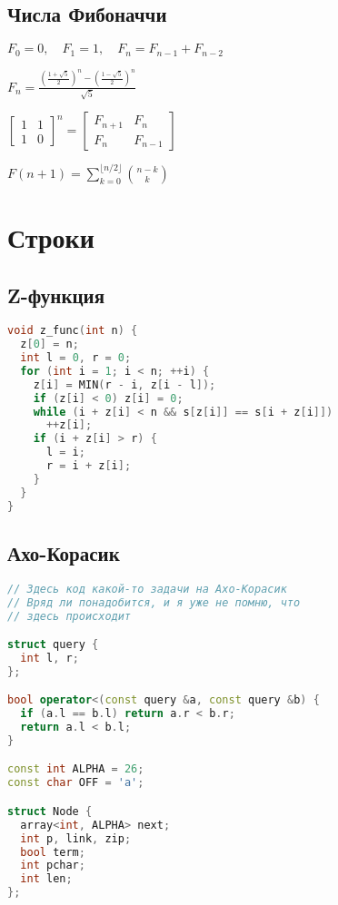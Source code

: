 \documentclass[10pt,a4paper,landscape,twosided]{extarticle}
\begin{document}
\begin{multicols}{3}
\subsection{Числа Фибоначчи}
$F_0 = 0, \quad F_1 = 1, \quad F_n = F_{n-1} + F_{n-2}$

$F_n = \frac{\left(\frac{1+\sqrt5}2\right)^n-\left(\frac{1-\sqrt5}2\right)^n}{\sqrt5}$

$\begin{bmatrix}1 & 1 \\ 1 & 0\end{bmatrix}^n=\begin{bmatrix}
    F_{n+1} & F_{n} \\
    F_n & F_{n-1}
\end{bmatrix}$

$F(n+1)=\sum\limits_{k=0}^{\lfloor n/2\rfloor}\binom{n-k}{k}$

\section{Строки}

\subsection{Z-функция}
\begin{lstlisting}[language=C++]
void z_func(int n) {
  z[0] = n;
  int l = 0, r = 0;
  for (int i = 1; i < n; ++i) {
    z[i] = MIN(r - i, z[i - l]);
    if (z[i] < 0) z[i] = 0;
    while (i + z[i] < n && s[z[i]] == s[i + z[i]])
      ++z[i];
    if (i + z[i] > r) {
      l = i;
      r = i + z[i];
    }
  }
}
\end{lstlisting}

\subsection{Ахо-Корасик}
\begin{lstlisting}[language=C++]
// Здесь код какой-то задачи на Ахо-Корасик
// Вряд ли понадобится, и я уже не помню, что
// здесь происходит

struct query {
  int l, r;
};

bool operator<(const query &a, const query &b) {
  if (a.l == b.l) return a.r < b.r;
  return a.l < b.l;
}

const int ALPHA = 26;
const char OFF = 'a';

struct Node {
  array<int, ALPHA> next;
  int p, link, zip;
  bool term;
  int pchar;
  int len;
};


\end{lstlisting}
\end{multicols}
\end{document}
